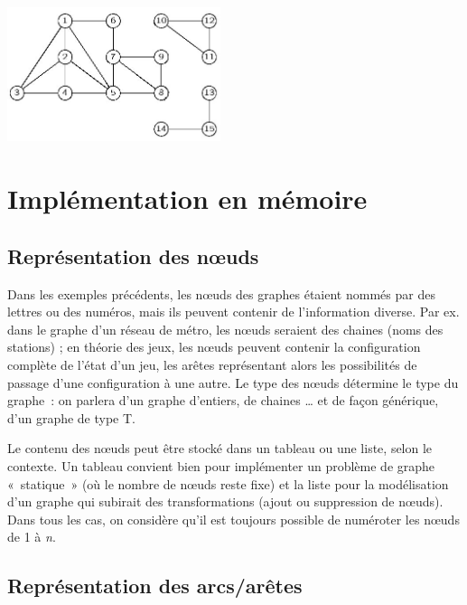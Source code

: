 		\begin{center}
		\includegraphics[width=6.235cm,height=3.955cm]{image/a2012Logique2eme-img048.jpg}
		\end{center}



\section{Implémentation en mémoire}

	\subsection{Représentation des n{\oe}uds}
				
		Dans les exemples précédents, les n{\oe}uds des graphes étaient 
		nommés par des lettres ou des numéros, mais ils peuvent
		contenir de l'information diverse. Par ex. dans le graphe 
		d'un réseau de métro, les n{\oe}uds seraient des chaines
		(noms des stations) ; en théorie des jeux, les n{\oe}uds 
		peuvent contenir la configuration complète de l'état d'un jeu,
		les arêtes représentant alors les possibilités de passage 
		d'une configuration à une autre. Le type des n{\oe}uds
		détermine le type du graphe~: on parlera d'un graphe d'entiers, 
		de chaines {\dots} et de façon générique, d'un graphe de type T.

		Le contenu des n{\oe}uds peut être stocké dans un tableau ou une 
		liste, selon le contexte. Un tableau convient bien pour
		implémenter un problème de graphe «~statique~» (où le nombre 
		de n{\oe}uds reste fixe) et la liste pour la modélisation
		d'un graphe qui subirait des transformations (ajout ou 
		suppression de n{\oe}uds). Dans tous les cas, on considère qu'il
		est toujours possible de numéroter les n{\oe}uds de 1 à \textit{n}.

	\subsection{Représentation des arcs/arêtes}
				
